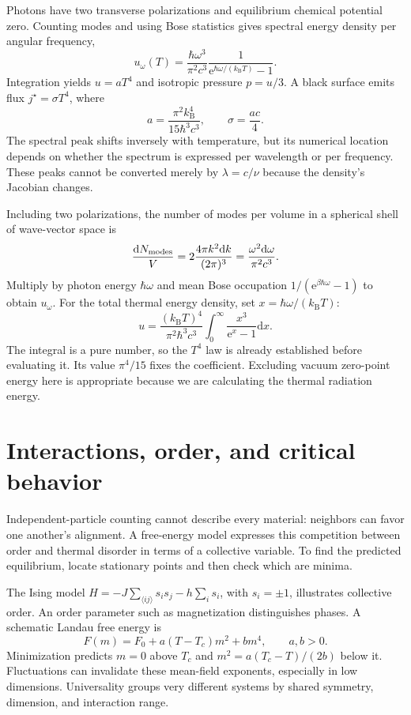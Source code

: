 \documentclass[11pt,oneside]{book}
\newcommand{\dd}{\mathrm{d}}
\newcommand{\ee}{\mathrm{e}}
\newcommand{\kb}{k_{\mathrm B}}
\theoremstyle{reviewstyle}
\begin{document}
Photons have two transverse polarizations and equilibrium chemical potential zero. Counting modes and using Bose statistics gives spectral energy density per angular frequency,
\begin{equation}
u_\omega(T)=\frac{\hbar\omega^3}{\pi^2c^3}\frac1{\ee^{\hbar\omega/(\kb T)}-1}.
\end{equation}
Integration yields $u=aT^4$ and isotropic pressure $p=u/3$. A black surface emits flux $j^\star=\sigma T^4$, where
\begin{equation}a=\frac{\pi^2\kb^4}{15\hbar^3c^3},\qquad \sigma=\frac{ac}{4}.\end{equation}
The spectral peak shifts inversely with temperature, but its numerical location depends on whether the spectrum is expressed per wavelength or per frequency. These peaks cannot be converted merely by $\lambda=c/\nu$ because the density's Jacobian changes.

Including two polarizations, the number of modes per volume in a spherical shell of wave-vector space is
\begin{equation}
\frac{\dd N_{\rm modes}}V=2\frac{4\pi k^2\dd k}{(2\pi)^3}
=\frac{\omega^2\dd\omega}{\pi^2c^3}.
\end{equation}
Multiply by photon energy $\hbar\omega$ and mean Bose occupation $1/(\ee^{\beta\hbar\omega}-1)$ to obtain $u_\omega$. For the total thermal energy density, set $x=\hbar\omega/(\kb T)$:
\begin{equation}
u=\frac{(\kb T)^4}{\pi^2\hbar^3c^3}
\int_0^\infty\frac{x^3}{\ee^x-1}\dd x.
\end{equation}
The integral is a pure number, so the $T^4$ law is already established before evaluating it. Its value $\pi^4/15$ fixes the coefficient. Excluding vacuum zero-point energy here is appropriate because we are calculating the thermal radiation energy.

\section{Interactions, order, and critical behavior}
Independent-particle counting cannot describe every material: neighbors can favor one another's alignment. A free-energy model expresses this competition between order and thermal disorder in terms of a collective variable. To find the predicted equilibrium, locate stationary points and then check which are minima.

The Ising model $H=-J\sum_{\langle ij\rangle}s_is_j-h\sum_i s_i$, with $s_i=\pm1$, illustrates collective order. An order parameter such as magnetization distinguishes phases. A schematic Landau free energy is
\begin{equation}F(m)=F_0+a(T-T_c)m^2+bm^4,\qquad a,b>0.\end{equation}
Minimization predicts $m=0$ above $T_c$ and $m^2=a(T_c-T)/(2b)$ below it. Fluctuations can invalidate these mean-field exponents, especially in low dimensions. Universality groups very different systems by shared symmetry, dimension, and interaction range.
\end{document}
